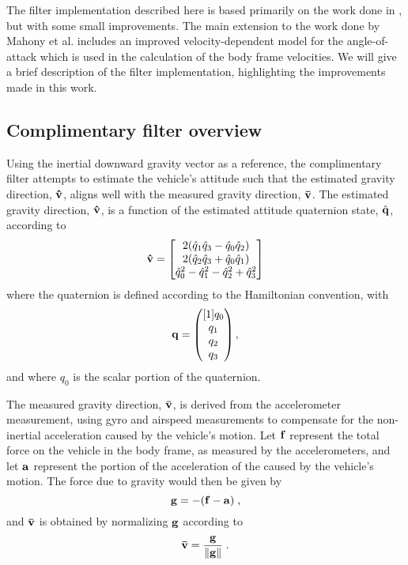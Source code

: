 
The filter implementation described here is based primarily on the work done in \cite{Mahony11}, but with some small improvements. The main extension to the work done by Mahony et al. includes an improved velocity-dependent model for the angle-of-attack which is used in the calculation of the body frame velocities. We will give a brief description of the filter implementation, highlighting the improvements made in this work.

\subsection{Complimentary filter overview}
Using the inertial downward gravity vector as a reference, the complimentary filter attempts to estimate the vehicle's attitude such that the estimated gravity direction, $\vhat$, aligns well with the measured gravity direction, $\vbar$. 
The estimated gravity direction, $\vhat$, is a function of the estimated attitude quaternion state, $\q[\hat]$, according to
\begin{equation}
	\vhat =
  \begin{bmatrix}
    2(\hat{q}_1\hat{q}_3 - \hat{q}_0\hat{q}_2) \\
    2(\hat{q}_2\hat{q}_3 + \hat{q}_0\hat{q}_1) \\
    \hat{q}_0^2 - \hat{q}_1^2 - \hat{q}_2^2 + \hat{q}_3^2
  \end{bmatrix}
\end{equation}
where the quaternion is defined according to the Hamiltonian convention, with
\begin{equation}
	\q = \pmat{q_0 \\ q_1 \\ q_2 \\ q_3},
\end{equation}
and where $q_0$ is the scalar portion of the quaternion.

The measured gravity direction, $\vbar$, is derived from the accelerometer measurement, using gyro and airspeed measurements to compensate for the non-inertial acceleration caused by the vehicle's motion.
Let $\f$ represent the total force on the vehicle in the body frame, as measured by the accelerometers, and let $\accel$ represent the portion of the acceleration of the caused by the vehicle's motion. 
The force due to gravity would then be given by
\begin{equation}
	\g = -(\f - \accel) \;,
\end{equation}
and $\vbar$ is obtained by normalizing $\g$ according to
\begin{equation}
	\vbar = \frac{\g}{\norm{\g}} \;.
\end{equation}

